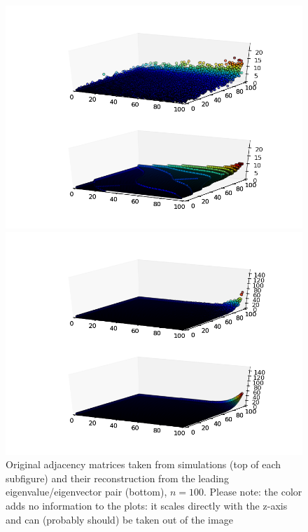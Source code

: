 \documentclass[11pt]{article}
\begin{document}
\begin{figure}[h!]
  \begin{minipage}[c][10cm][t]{.9\textwidth}
    \centering
    \includegraphics[width=12cm]{adjReconShort100}
  \end{minipage}
  \begin{minipage}[c][10cm][t]{.9\textwidth}
    \centering
    \includegraphics[width=12cm]{adjReconLong100}
  \end{minipage}
  \caption{Original adjacency matrices taken from simulations (top of each subfigure) and their reconstruction from the leading eigenvalue/eigenvector pair (bottom), $n=100$. Please note: the color adds no information to the plots: it scales directly with the z-axis and can (probably should) be taken out of the image}
  \label{fig:adjRecon}
\end{figure}
 
\end{document}
